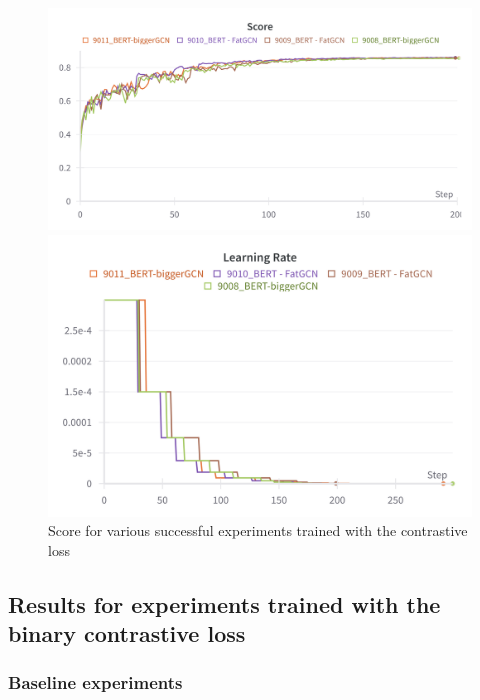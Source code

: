 \begin{figure}
\centering
\begin{minipage}{0.4\textwidth}
\includegraphics[width=\textwidth]{figures/9010_score.png}
\end{minipage}
\hfill
\begin{minipage}{0.4\textwidth}
\includegraphics[width=\textwidth]{figures/W&B Chart 04_02_2024 10_34_42.png}   
\end{minipage}
\caption{Score for various successful experiments trained with the contrastive loss}
\label{fig:old_best}
\end{figure}

\subsection{Results for experiments trained with the binary contrastive loss}

\subsubsection{Baseline experiments}
\label{sec:baseline_new}

